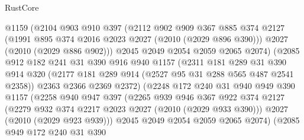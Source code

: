 \begin{lexlean}{RustCore}
\begin{coremodule}
                      @1159
                      (@2104
                        @903
                        @910
                        @397
                        (@2112
                          @902
                          @909
                          @367
                          @885
                          @374
                          @2127
                          (@1991 @895 @374 @2016 @2023 @2027 (@2010 (@2029 @896 @390)))
                          @2027
                          (@2010 (@2029 @886 @902)))
                        @2045
                        @2049
                        @2054
                        @2059
                        @2065
                        @2074)
                      (@2085
                        @912
                        @182
                        @241
                        @31
                        @390
                        @916
                        @940
                        @1157
                        (@2311
                          @181
                          @289
                          @31
                          @390
                          @914
                          @320
                          (@2177 @181 @289 @914 (@2527 @95 @31 @288 @565 @487 @2541 @2358))
                          @2363
                          @2366
                          @2369
                          @2372)
                        (@2248
                          @172
                          @240
                          @31
                          @940
                          @949
                          @390
                          @1157
                          (@2258
                            @940
                            @947
                            @397
                            (@2265
                              @939
                              @946
                              @367
                              @922
                              @374
                              @2127
                              (@2279 @932 @374 @2217 @2023 @2027 (@2010 (@2029 @933 @390)))
                              @2027
                              (@2010 (@2029 @923 @939)))
                            @2045
                            @2049
                            @2054
                            @2059
                            @2065
                            @2074)
                          (@2085
                            @949
                            @172
                            @240
                            @31
                            @390

\end{coremodule}
\end{lexlean}
